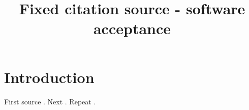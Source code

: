\documentclass[11pt]{article}
\begin{document}
\title{Fixed citation source - software acceptance}
\maketitle
\section{Introduction}
First source \citep{evidence_3a2639ee8b5e432aafd7e3743c825f33}. Next \citep{evidence_b5348fa59b3948ae9540b75a33ca9bd9}. Repeat \citep{evidence_3a2639ee8b5e432aafd7e3743c825f33}.



\end{document}
